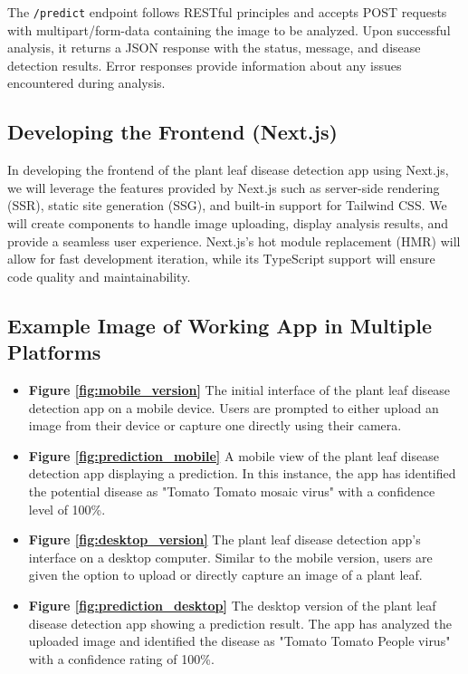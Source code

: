 \documentclass{article}
\begin{document}
The \texttt{/predict} endpoint follows RESTful principles and accepts POST requests with multipart/form-data containing the image to be analyzed. Upon successful analysis, it returns a JSON response with the status, message, and disease detection results. Error responses provide information about any issues encountered during analysis.



\subsection{Developing the Frontend (Next.js)}

In developing the frontend of the plant leaf disease detection app using Next.js, we will leverage the features provided by Next.js such as server-side rendering (SSR), static site generation (SSG), and built-in support for Tailwind CSS. We will create components to handle image uploading, display analysis results, and provide a seamless user experience. Next.js's hot module replacement (HMR) will allow for fast development iteration, while its TypeScript support will ensure code quality and maintainability.

\subsection{Example Image of Working App in Multiple Platforms}

\begin{itemize}
    \item \textbf{Figure \ref{fig:mobile_version}} The initial interface of the plant leaf disease detection app on a mobile device. Users are prompted to either upload an image from their device or capture one directly using their camera.
    \item \textbf{Figure \ref{fig:prediction_mobile}} A mobile view of the plant leaf disease detection app displaying a prediction. In this instance, the app has identified the potential disease as "Tomato Tomato mosaic virus" with a confidence level of 100\%.
    \item \textbf{Figure \ref{fig:desktop_version}} The plant leaf disease detection app's interface on a desktop computer. Similar to the mobile version, users are given the option to upload or directly capture an image of a plant leaf.
    \item \textbf{Figure \ref{fig:prediction_desktop}} The desktop version of the plant leaf disease detection app showing a prediction result. The app has analyzed the uploaded image and identified the disease as "Tomato Tomato People virus" with a confidence rating of 100\%.
\end{itemize}
\end{document}
